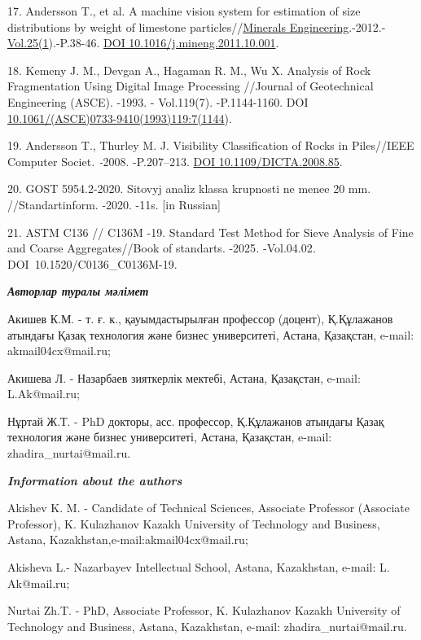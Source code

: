 \begin{refs}
17. Andersson T., et al. A machine vision system for estimation of size
distributions by weight of limestone
particles//\href{https://www.sciencedirect.com/journal/minerals-engineering}{Minerals
Engineering}.-2012.-\href{Vol.\%2025(1}{Vol.25(1}).-P.38-46.
\href{https://doi.org/10.1016/j.mineng.2011.10.001}{DOI
10.1016/j.mineng.2011.10.001}.

18. Kemeny J. M., Devgan A., Hagaman R. M., Wu X. Analysis of Rock
Fragmentation Using Digital Image Processing //Journal of Geotechnical
Engineering (ASCE). -1993. - Vol.119(7). -P.1144-1160. DOI
\href{https://doi.org/10.1061/(ASCE)0733-9410(1993)119:7(1144)}{10.1061/(ASCE)0733-9410(1993)119:7(1144}).

19. Andersson T., Thurley M. J. Visibility Classification of Rocks in
Piles//IEEE Computer Societ\emph{. -}2008. -P.207--213.
\href{https://doi.org/10.1109/DICTA.2008.85}{DOI 10.1109/DICTA.2008.85}.

20. GOST 5954.2-2020. Sitovyj analiz klassa krupnosti ne menee 20 mm.
//Standartinform. -2020. -11s. {[}in Russian{]}

21. ASTM C136 // C136M -19. Standard Test Method for Sieve Analysis of
Fine and Coarse Aggregates//Book of standarts. -2025\emph{.}
-Vol.04.02\emph{.} DOI~10.1520/C0136\_C0136M-19.
\end{refs}

\begin{info}
\hspace{1em}\emph{{\bfseries Авторлар туралы мәлімет}}

Акишев К.М. - т. ғ. к., қауымдастырылған профессор (доцент), Қ.Құлажанов
атындағы Қазақ технология және бизнес университеті, Астана, Қазақстан,
e-mail: akmail04cx@mail.ru;

Акишева Л. - Назарбаев зияткерлік мектебі, Астана, Қазақстан, e-mail:
L.Ak@mail.ru;

Нұртай Ж.Т. - PhD докторы, асс. профессор, Қ.Құлажанов атындағы Қазақ
технология және бизнес университеті, Астана, Қазақстан, e-mail:
zhadira\_nurtai@mail.ru.

\hspace{1em}\emph{{\bfseries Information about the authors}}

Akishev K. M. - Candidate of Technical Sciences, Associate Professor
(Associate Professor), K. Kulazhanov Kazakh University of Technology and
Business, Astana, Kazakhstan,e-mail:akmail04cx@mail.ru;

Akisheva L.- Nazarbayev Intellectual School, Astana, Kazakhstan, e-mail:
L. Ak@mail.ru;

Nurtai Zh.T. - PhD, Associate Professor, K. Kulazhanov Kazakh University
of Technology and Business, Astana, Kazakhstan, e-mail:
zhadira\_nurtai@mail.ru.
\end{info}
